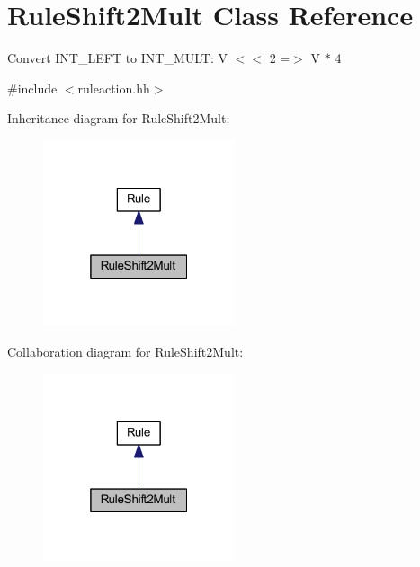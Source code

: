 \hypertarget{class_rule_shift2_mult}{}\section{Rule\+Shift2\+Mult Class Reference}
\label{class_rule_shift2_mult}


Convert I\+N\+T\+\_\+\+L\+E\+FT to I\+N\+T\+\_\+\+M\+U\+LT\+: {\ttfamily V $<$$<$ 2 =$>$ V $\ast$ 4}  




{\ttfamily \#include $<$ruleaction.\+hh$>$}



Inheritance diagram for Rule\+Shift2\+Mult\+:
\nopagebreak
\begin{figure}[H]
\begin{center}
\leavevmode
\includegraphics[width=160pt]{class_rule_shift2_mult__inherit__graph}
\end{center}
\end{figure}


Collaboration diagram for Rule\+Shift2\+Mult\+:
\nopagebreak
\begin{figure}[H]
\begin{center}
\leavevmode
\includegraphics[width=160pt]{class_rule_shift2_mult__coll__graph}
\end{center}
\end{figure}
